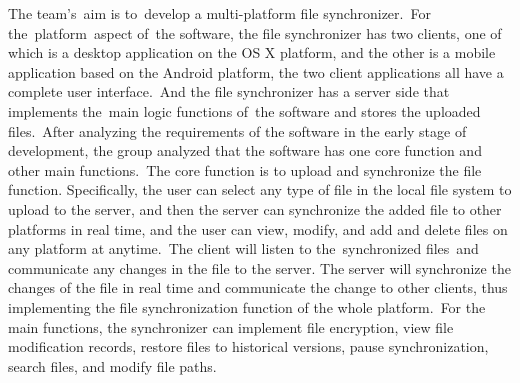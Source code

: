 \documentclass{article}
\begin{document}
	The team’s aim is to develop a multi-platform file synchronizer. For the platform aspect of the software, the file synchronizer has two clients, one of which is a desktop application on the OS X platform, and the other is a mobile application based on the Android platform, the two client applications all have a complete user interface. And the file synchronizer has a server side that implements the main logic functions of the software and stores the uploaded files. After analyzing the requirements of the software in the early stage of development, the group analyzed that the software has one core function and other main functions. The core function is to upload and synchronize the file function. Specifically, the user can select any type of file in the local file system to upload to the server, and then the server can synchronize the added file to other platforms in real time, and the user can view, modify, and add and delete files on any platform at anytime. The client will listen to the synchronized files and communicate any changes in the file to the server. The server will synchronize the changes of the file in real time and communicate the change to other clients, thus implementing the file synchronization function of the whole platform. For the main functions, the synchronizer can implement file encryption, view file modification records, restore files to historical versions, pause synchronization, search files, and modify file paths.
	\\ \hspace*{\fill} \\
\end{document}
